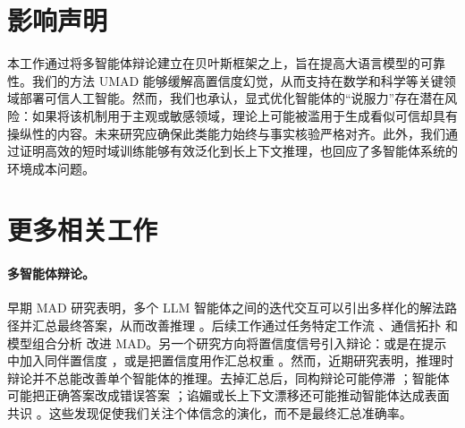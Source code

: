 \documentclass{article}
\theoremstyle{plain}
\theoremstyle{definition}
\theoremstyle{remark}
\begin{document}
\section*{影响声明}

本工作通过将多智能体辩论建立在贝叶斯框架之上，旨在提高大语言模型的可靠性。我们的方法 UMAD 能够缓解高置信度幻觉，从而支持在数学和科学等关键领域部署可信人工智能。然而，我们也承认，显式优化智能体的“说服力”存在潜在风险：如果将该机制用于主观或敏感领域，理论上可能被滥用于生成看似可信却具有操纵性的内容。未来研究应确保此类能力始终与事实核验严格对齐。此外，我们通过证明高效的短时域训练能够有效泛化到长上下文推理，也回应了多智能体系统的环境成本问题。









\newpage
\appendix
\onecolumn



\section{更多相关工作}
\label{app:more_related}
\paragraph{多智能体辩论。}
早期 MAD 研究表明，多个 LLM 智能体之间的迭代交互可以引出多样化的解法路径并汇总最终答案，从而改善推理 \cite{du2023improving, liang2024encouraging, chan2024chateval}。后续工作通过任务特定工作流 \cite{liu2024groupdebate, zhang2025debate4math, maiga2025error, yao2025peacemaker}、通信拓扑 \cite{li2024improving, sun2025cortexdebate, eo2025necessary} 和模型组合分析 \cite{zhang2025if, smit2023should} 改进 MAD。另一个研究方向将置信度信号引入辩论：或是在提示中加入同伴置信度 \cite{yang2024confidence, chen2024reconcile}，或是把置信度用作汇总权重 \cite{lin2025enhancing, eo2025necessary, yoffe2024debunc}。然而，近期研究表明，推理时辩论并不总能改善单个智能体的推理。去掉汇总后，同构辩论可能停滞 \cite{choi2025debate}；智能体可能把正确答案改成错误答案 \cite{wynn2025talk}；谄媚或长上下文漂移还可能推动智能体达成表面共识 \cite{pan2025multiagent, yang2025revisiting}。这些发现促使我们关注个体信念的演化，而不是最终汇总准确率。
\end{document}
